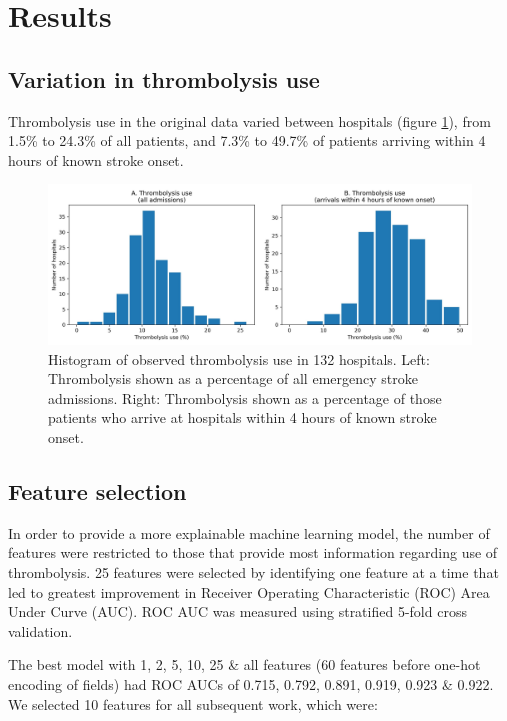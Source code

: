 \section{Results}

\subsection{Variation in thrombolysis use}

Thrombolysis use in the original data varied between hospitals (figure \ref{fig:observed_thrombolysis}), from 1.5\% to 24.3\% of all patients, and 7.3\% to 49.7\% of patients arriving within 4 hours of known stroke onset.

\begin{figure}
\centering
\includegraphics[width=1.0\textwidth]{./images/thrombolysis_hist}
\caption{Histogram of observed thrombolysis use in 132 hospitals. Left: Thrombolysis shown as a percentage of all emergency stroke admissions. Right: Thrombolysis shown as a percentage of those patients who arrive at hospitals within 4 hours of known stroke onset.}
\label{fig:observed_thrombolysis}
\end{figure}

\subsection{Feature selection}

In order to provide a more explainable machine learning model, the number of features were restricted to those that provide most information regarding use of thrombolysis. 25 features were selected by identifying one feature at a time that led to greatest improvement in Receiver Operating Characteristic (ROC) Area Under Curve (AUC). ROC AUC was measured using stratified 5-fold cross validation.

The best model with 1, 2, 5, 10, 25 & all features (60 features before one-hot encoding of fields) had ROC AUCs of 0.715, 0.792, 0.891, 0.919, 0.923 & 0.922. We selected 10 features for all subsequent work, which were:

